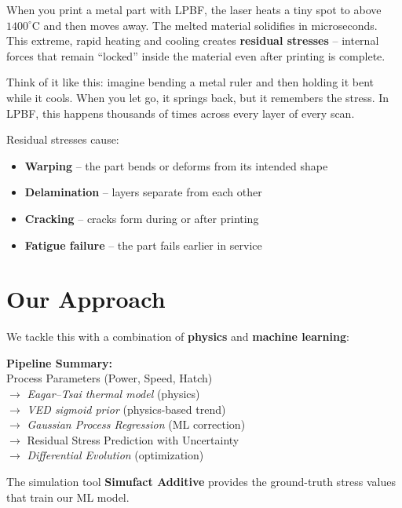 \documentclass[12pt,a4paper]{report}
\begin{document}
When you print a metal part with LPBF, the laser heats a tiny spot to above $1400^\circ$C and then moves away. The melted material solidifies in microseconds. This extreme, rapid heating and cooling creates \textbf{residual stresses} -- internal forces that remain ``locked'' inside the material even after printing is complete.

Think of it like this: imagine bending a metal ruler and then holding it bent while it cools. When you let go, it springs back, but it remembers the stress. In LPBF, this happens thousands of times across every layer of every scan.

Residual stresses cause:
\begin{itemize}
  \item \textbf{Warping} -- the part bends or deforms from its intended shape
  \item \textbf{Delamination} -- layers separate from each other
  \item \textbf{Cracking} -- cracks form during or after printing
  \item \textbf{Fatigue failure} -- the part fails earlier in service
\end{itemize}

\section{Our Approach}

We tackle this with a combination of \textbf{physics} and \textbf{machine learning}:

\begin{keybox}
\textbf{Pipeline Summary:}\\
Process Parameters (Power, Speed, Hatch) \\
$\rightarrow$ \textit{Eagar--Tsai thermal model} (physics) \\
$\rightarrow$ \textit{VED sigmoid prior} (physics-based trend) \\
$\rightarrow$ \textit{Gaussian Process Regression} (ML correction) \\
$\rightarrow$ Residual Stress Prediction with Uncertainty \\
$\rightarrow$ \textit{Differential Evolution} (optimization)
\end{keybox}

The simulation tool \textbf{Simufact Additive} provides the ground-truth stress values that train our ML model.

\end{document}
